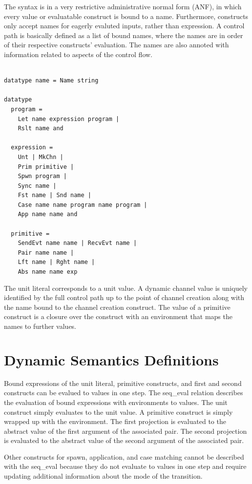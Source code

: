 \documentclass{article}
\begin{document}
The syntax is in a very restrictive administrative normal form (ANF), in which every value or
evaluatable construct is bound to a name.  Furthermore, constructs only accept names for
eagerly evaluted inputs, rather than expression.  A control path is basically defined as a list
of bound names, where the names are in order of their respective constructs' evaluation. The
names are also annoted with information related to aspects of the control flow. 

\begin{lstlisting}[language=logic, escapechar=\%]

datatype name = Name string

datatype 
  program = 
    Let name expression program |
    Rslt name and 

  expression = 
    Unt | MkChn |
    Prim primitive |
    Spwn program |
    Sync name |
    Fst name | Snd name |
    Case name name program name program |
    App name name and 

  primitive = 
    SendEvt name name | RecvEvt name |
    Pair name name |
    Lft name | Rght name |
    Abs name name exp

  \end{lstlisting}


The unit literal corresponds to a unit value. A dynamic channel value is uniquely identified by
the full control path up to the point of channel creation along with the name bound to the
channel creation construct. The value of a primitive construct is a closure over the construct
with an environment that maps the names to further values.

\section{Dynamic Semantics Definitions}

Bound expressions of the unit literal, primitive constructs, and first and second constructs
can be evalued to values in one step. The seq\_eval relation describes the evaluation of bound
expressions with environments to values. The unit construct simply evaluates to the unit
value.  A primitive construct is simply wrapped up with the environment.  The first projection is
evaluated to the abstract value of the first argument of the associated pair. The second
projection is evaluated to the abstract value of the second argument of the associated pair.

Other constructs for spawn, application, and case matching cannot be described with the
seq\_eval because they do not evaluate to values in one step and require updating additional
information about the mode of the transition. 
\end{document}

